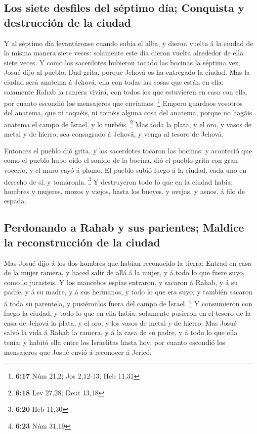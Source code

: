 \hypertarget{los-siete-desfiles-del-suxe9ptimo-duxeda-conquista-y-destrucciuxf3n-de-la-ciudad}{%
\subsection{Los siete desfiles del séptimo día; Conquista y destrucción
de la
ciudad}\label{los-siete-desfiles-del-suxe9ptimo-duxeda-conquista-y-destrucciuxf3n-de-la-ciudad}}

 Y al séptimo día levantáronse cuando subía el alba, y
dieron vuelta á la ciudad de la misma manera siete veces: solamente este
día dieron vuelta alrededor de ella siete veces.  Y como
los sacerdotes hubieron tocado las bocinas la séptima vez, Josué dijo al
pueblo: Dad grita, porque Jehová os ha entregado la ciudad.
 Mas la ciudad será anatema á Jehová, ella con todas las
cosas que están en ella: solamente Rahab la ramera vivirá, con todos los
que estuvieren en casa con ella, por cuanto escondió los mensajeros que
enviamos. \footnote{\textbf{6:17} Núm 21,2; Jos 2,12-13; Heb 11,31}
 Empero guardaos vosotros del anatema, que ni toquéis, ni
toméis alguna cosa del anatema, porque no hagáis anatema el campo de
Israel, y lo turbéis. \footnote{\textbf{6:18} Lev 27,28; Deut 13,18}
 Mas toda la plata, y el oro, y vasos de metal y de hierro,
sea consagrado á Jehová, y venga al tesoro de Jehová.

 Entonces el pueblo dió grita, y los sacerdotes tocaron las
bocinas: y aconteció que como el pueblo hubo oído el sonido de la
bocina, dió el pueblo grita con gran vocerío, y el muro cayó á plomo. El
pueblo subió luego á la ciudad, cada uno en derecho de sí, y tomáronla.
\footnote{\textbf{6:20} Heb 11,30}  Y destruyeron todo lo
que en la ciudad había; hombres y mujeres, mozos y viejos, hasta los
bueyes, y ovejas, y asnos, á filo de espada.

\hypertarget{perdonando-a-rahab-y-sus-parientes-maldice-la-reconstrucciuxf3n-de-la-ciudad}{%
\subsection{Perdonando a Rahab y sus parientes; Maldice la
reconstrucción de la
ciudad}\label{perdonando-a-rahab-y-sus-parientes-maldice-la-reconstrucciuxf3n-de-la-ciudad}}

 Mas Josué dijo á los dos hombres que habían reconocido la
tierra: Entrad en casa de la mujer ramera, y haced salir de allá á la
mujer, y á todo lo que fuere suyo, como lo jurasteis.  Y
los mancebos espías entraron, y sacaron á Rahab, y á su padre, y á su
madre, y á sus hermanos, y todo lo que era suyo; y también sacaron á
toda su parentela, y pusiéronlos fuera del campo de Israel. \footnote{\textbf{6:23}
  Núm 31,19}  Y consumieron con fuego la ciudad, y todo lo
que en ella había: solamente pusieron en el tesoro de la casa de Jehová
la plata, y el oro, y los vasos de metal y de hierro.  Mas
Josué salvó la vida á Rahab la ramera, y á la casa de su padre, y á todo
lo que ella tenía: y habitó ella entre los Israelitas hasta hoy; por
cuanto escondió los mensajeros que Josué envió á reconocer á Jericó.

